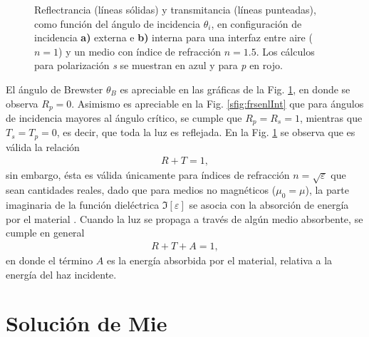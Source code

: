 \begin{figure}[h!]
\begin{subfigure}{.43\textwidth}
	\end{subfigure}\vspace*{-.7em}
	\caption{  Reflectrancia (líneas sólidas) y transmitancia (líneas punteadas), como función del ángulo de incidencia $\theta_i$, en configuración de incidencia \textbf{a)} externa e \textbf{b)} interna para una interfaz entre  aire ($n=1$) y un medio con índice de refracción $n = 1.5$. Los cálculos para polarización  \emph{s} se muestran  en azul y  para \emph{p} en rojo.}	\label{fig:frsnel}	
	\end{figure}	
%

El ángulo de Brewster $\theta_B$ es apreciable en las gráficas de la Fig. \ref{fig:frsnel}, en donde se observa $R_p = 0$. Asimismo es apreciable en la Fig. \ref{sfig:frsenlInt} que para ángulos de incidencia mayores al ángulo crítico, se cumple que $R_p = R_s = 1$, mientras que $T_s = T_p = 0$, es decir, que toda la luz es reflejada. En la Fig. \ref{fig:frsnel} se observa que es válida la relación 
	\begin{align*}
	R + T = 1,
	\end{align*}
sin embargo, ésta es válida únicamente para índices de refracción $n = \sqrt{\varepsilon}$ que sean cantidades reales, dado que para medios no magnéticos ($\mu_0 = \mu$), la parte imaginaria de la función dieléctrica $\Im[\varepsilon]$ se asocia con la absorción de energía por el material \cite{ibach2003solid}. Cuando la luz se propaga a través de algún medio absorbente, se cumple en general 
	\begin{align*}
	R + T + A = 1,
	\end{align*}
en donde el término $A$ es la energía absorbida por el material, relativa a la energía del haz incidente.

	
\section{Solución de Mie}

